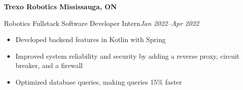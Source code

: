\textbf{Trexo Robotics \hfill Mississauga, ON}

Robotics Fullstack Software Developer Intern\hfill \textit{Jan 2022--Apr 2022}
\begin{itemize}
    \item Developed backend features in Kotlin with Spring
    \item Improved system reliability and security by adding a reverse proxy, circuit breaker, and a firewall
    \item Optimized database queries, making queries 15\% faster
\end{itemize}
